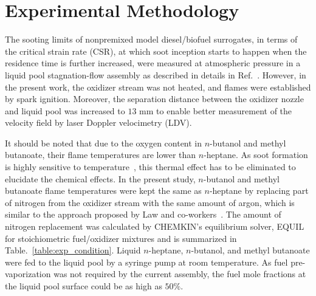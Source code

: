 \documentclass[preprint,3p,times,twocolumn]{elsarticleUS}
\begin{document}
\section{Experimental Methodology}

The sooting limits of nonpremixed model diesel/biofuel surrogates, in terms of the critical strain rate (CSR), at which soot inception starts to happen when the residence time is further increased, were measured at atmospheric pressure in a liquid pool stagnation-flow assembly as described in details in Ref.~\cite{liu10}. However, in the present work, the oxidizer stream was not heated, and flames were established by spark ignition. Moreover, the separation distance between the oxidizer nozzle and liquid pool was increased to $13$ mm to enable better measurement of the velocity field by laser Doppler velocimetry (LDV).

It should be noted that due to the oxygen content in $n$-butanol and methyl butanoate, their flame temperatures are lower than $n$-heptane. As soot formation is highly sensitive to temperature~\cite{wang11}, this thermal effect has to be eliminated to elucidate the chemical effects. In the present study, $n$-butanol and methyl butanoate flame temperatures were kept the same as $n$-heptane by replacing part of nitrogen from the oxidizer stream with the same amount of argon, which is similar to the approach proposed by Law and co-workers~\cite{du89,du91,axelbaum91}. The amount of nitrogen replacement was calculated by CHEMKIN's equilibrium solver, EQUIL\cite{chemkin} for stoichiometric fuel/oxidizer mixtures and is summarized in Table.~\ref{table:exp_condition}. Liquid $n$-heptane, $n$-butanol, and methyl butanoate were fed to the liquid pool by a syringe pump at room temperature. As fuel pre-vaporization was not required by the current assembly, the fuel mole fractions at the liquid pool surface could be as high as $50\%$.
\end{document}
